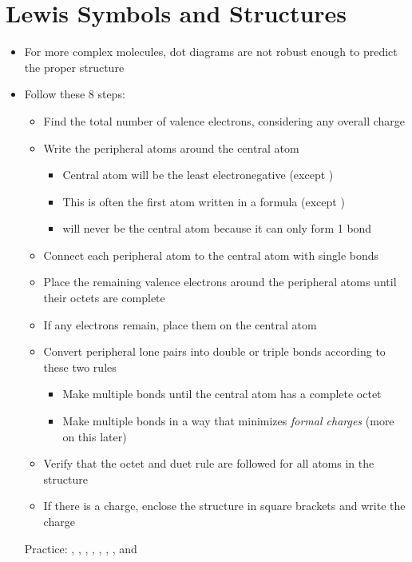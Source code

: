 \documentclass[12pt, openany, letterpaper]{memoir}
\begin{document}
\section{Lewis Symbols and Structures}
\begin{itemize}
    \item For more complex molecules, dot diagrams are not robust enough to predict the proper structure
    \item Follow these 8 steps:
          \begin{itemize}
            \item Find the total number of valence electrons, considering any overall charge
            \item Write the peripheral atoms around the central atom
                  \begin{itemize}
                    \item Central atom will be the least electronegative (except )
                    \item This is often the first atom written in a formula (except )
                    \item {} will never be the central atom because it can only form 1 bond
                  \end{itemize}
            \item Connect each peripheral atom to the central atom with single bonds
            \item Place the remaining valence electrons around the peripheral atoms until their octets are complete
            \item If any electrons remain, place them on the central atom
            \item Convert peripheral lone pairs into double or triple bonds according to these two rules
                  \begin{itemize}
                    \item Make multiple bonds until the central atom has a complete octet
                    \item Make multiple bonds in a way that minimizes \emph{formal charges} (more on this later)
                  \end{itemize}
            \item Verify that the octet and duet rule are followed for all atoms in the structure
            \item If there is a charge, enclose the structure in square brackets and write the charge
          \end{itemize}

          Practice: , , , , , , , and 
\end{itemize}
\end{document}
